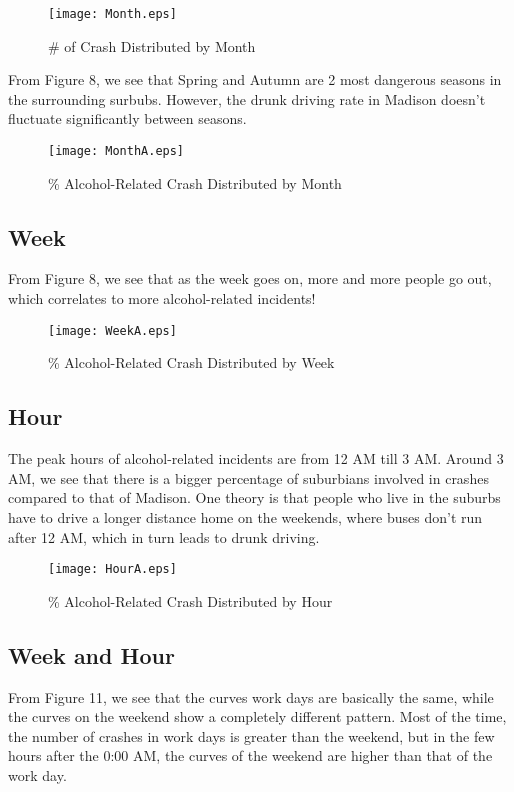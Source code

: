 \documentclass[10pt]{article}
\begin{document}
\begin{figure}[H]
\flushleft
\texttt{[image: Month.eps]}
\caption{\# of Crash Distributed by Month}
\label{7}
\end{figure}

\newpage
From Figure 8, we see that Spring and Autumn are 2 most dangerous seasons in the surrounding surbubs. However, the drunk driving rate in Madison doesn't fluctuate significantly between seasons.

\begin{figure}[H]
\flushleft
\texttt{[image: MonthA.eps]}
\caption{\% Alcohol-Related Crash Distributed by Month}
\label{8}
\end{figure}

\newpage
\subsection{Week}
From Figure 8, we see that as the week goes on, more and more people go out, which correlates to more alcohol-related incidents!
\begin{figure}[H]
\flushleft
\texttt{[image: WeekA.eps]}
\caption{\% Alcohol-Related Crash Distributed by Week}
\label{9}
\end{figure}

\newpage
\subsection{Hour}
The peak hours of alcohol-related incidents are from 12 AM till 3 AM. Around 3 AM, we see that there is a bigger percentage of suburbians involved in crashes compared to that of Madison. One theory is that people who live in the suburbs have to drive a longer distance home on the weekends, where buses don't run after 12 AM, which in turn leads to drunk driving.
\begin{figure}[H]
\flushleft
\texttt{[image: HourA.eps]}
\caption{\% Alcohol-Related Crash Distributed by Hour}
\label{10}
\end{figure}

\newpage
\subsection{Week and Hour}
From Figure 11, we see that the curves work days are basically the same, while the curves on the weekend show a completely different pattern. Most of the time, the number of crashes in work days is greater than the weekend, but in the few hours after the 0:00 AM, the curves of the weekend are higher than that of the work day.
\end{document}
